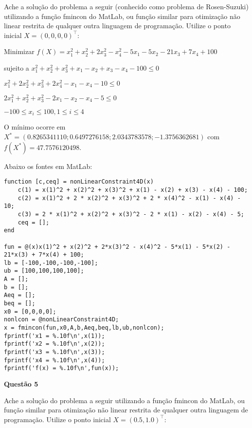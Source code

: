 \documentclass{rbfin}
\begin{document}
Ache a solução do problema a seguir (conhecido como problema de Rosen-Suzuki)
utilizando a função fmincon do MatLab, ou função similar para otimização não
linear restrita de qualquer outra linguagem de programação. Utilize o ponto inicial
$X = (0, 0, 0, 0)^\top$:

Minimizar $f(X) = x_1^2 + x_2^2 + 2x_3^2 - x_4^2 - 5x_1 - 5x_2 - 21x_3 + 7x_4 + 100$

sujeito a $x_1^2 + x_2^2 + x_3^2 + x_1 - x_2 + x_3 - x_4 - 100 \le 0$

$x_1^2 + 2x_2^2 + x_3^2 + 2x_4^2 - x_1 - x_4 - 10 \le 0$

$2x_1^2 + x_2^2 + x_3^2 - 2x_1 - x_2 - x_4 - 5 \le 0$

$-100 \le x_i \le 100, 1 \le i \le 4$

O mínimo ocorre em $X^* = (0.8265341110; 0.6497276158; 2.0343783578; -1.3756362681)$ com $f(X^*) = 47.7576120498$.

Abaixo os fontes em MatLab:

\singlespacing

\begin{verbatim}
function [c,ceq] = nonLinearConstraint4D(x)
    c(1) = x(1)^2 + x(2)^2 + x(3)^2 + x(1) - x(2) + x(3) - x(4) - 100;
    c(2) = x(1)^2 + 2 * x(2)^2 + x(3)^2 + 2 * x(4)^2 - x(1) - x(4) - 10;
    c(3) = 2 * x(1)^2 + x(2)^2 + x(3)^2 - 2 * x(1) - x(2) - x(4) - 5;
    ceq = [];
end

fun = @(x)x(1)^2 + x(2)^2 + 2*x(3)^2 - x(4)^2 - 5*x(1) - 5*x(2) - 21*x(3) + 7*x(4) + 100;
lb = [-100,-100,-100,-100];
ub = [100,100,100,100];
A = [];
b = [];
Aeq = [];
beq = [];
x0 = [0,0,0,0];
nonlcon = @nonLinearConstraint4D;
x = fmincon(fun,x0,A,b,Aeq,beq,lb,ub,nonlcon);
fprintf('x1 = %.10f\n',x(1));
fprintf('x2 = %.10f\n',x(2));
fprintf('x3 = %.10f\n',x(3));
fprintf('x4 = %.10f\n',x(4));
fprintf('f(x) = %.10f\n',fun(x));
\end{verbatim}

\vspace{6mm}

\large

\textbf{Questão 5}

\normalsize

\vspace{6mm}

\doublespacing

Ache a solução do problema a seguir utilizando a função fmincon do MatLab, ou
função similar para otimização não linear restrita de qualquer outra linguagem de
programação. Utilize o ponto inicial $X = (0.5, 1.0)^\top$:
\end{document}
